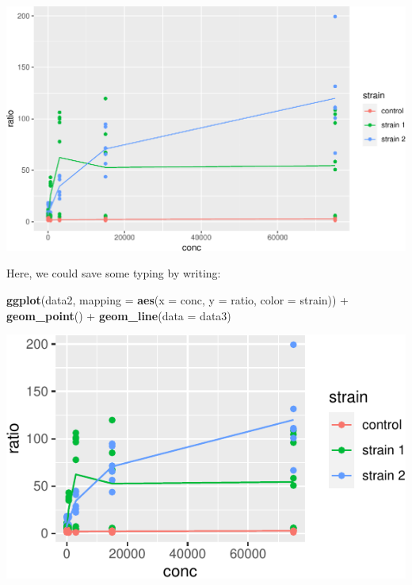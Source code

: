 \documentclass[]{book}
\newenvironment{Shaded}{}{}
\newcommand{\DataTypeTok}[1]{\textcolor[rgb]{0.56,0.13,0.00}{#1}}
\newcommand{\KeywordTok}[1]{\textcolor[rgb]{0.00,0.44,0.13}{\textbf{#1}}}
\newcommand{\NormalTok}[1]{#1}
\newcommand{\OperatorTok}[1]{\textcolor[rgb]{0.40,0.40,0.40}{#1}}
\newcommand{\StringTok}[1]{\textcolor[rgb]{0.25,0.44,0.63}{#1}}
\begin{document}
\begin{center}\includegraphics[width=\textwidth]{TRES-Tidy-Tutorial_files/figure-latex/unnamed-chunk-125-1} \end{center}

Here, we could save some typing by writing:

\begin{Shaded}
\begin{Highlighting}[]
 \KeywordTok{ggplot}\NormalTok{(data2, }\DataTypeTok{mapping =} \KeywordTok{aes}\NormalTok{(}\DataTypeTok{x =}\NormalTok{ conc, }\DataTypeTok{y =}\NormalTok{ ratio, }\DataTypeTok{color =}\NormalTok{ strain)) }\OperatorTok{+}
\StringTok{  }\KeywordTok{geom_point}\NormalTok{() }\OperatorTok{+}
\StringTok{  }\KeywordTok{geom_line}\NormalTok{(}\DataTypeTok{data =}\NormalTok{ data3)}
\end{Highlighting}
\end{Shaded}

\begin{center}\includegraphics[width=\textwidth]{TRES-Tidy-Tutorial_files/figure-latex/unnamed-chunk-126-1} \end{center}
\end{document}
